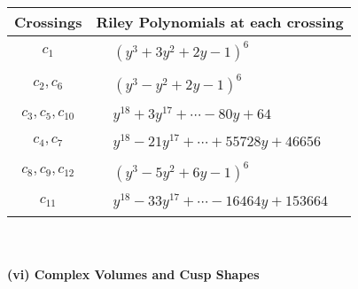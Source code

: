 \documentclass[1p]{elsarticle_modified}
\theoremstyle{definition}
\begin{document}
\begin{tabular}{m{50pt}|m{274pt}}
Crossings & \hspace{64pt}Riley Polynomials at each crossing \\
\hline $$\begin{aligned}c_{1}\end{aligned}$$&$\begin{aligned}
&(y^3+3 y^2+2 y-1)^6
\end{aligned}$\\
\hline $$\begin{aligned}c_{2},c_{6}\end{aligned}$$&$\begin{aligned}
&(y^3- y^2+2 y-1)^6
\end{aligned}$\\
\hline $$\begin{aligned}c_{3},c_{5},c_{10}\end{aligned}$$&$\begin{aligned}
&y^{18}+3 y^{17}+\cdots-80 y+64
\end{aligned}$\\
\hline $$\begin{aligned}c_{4},c_{7}\end{aligned}$$&$\begin{aligned}
&y^{18}-21 y^{17}+\cdots+55728 y+46656
\end{aligned}$\\
\hline $$\begin{aligned}c_{8},c_{9},c_{12}\end{aligned}$$&$\begin{aligned}
&(y^3-5 y^2+6 y-1)^6
\end{aligned}$\\
\hline $$\begin{aligned}c_{11}\end{aligned}$$&$\begin{aligned}
&y^{18}-33 y^{17}+\cdots-16464 y+153664
\end{aligned}$\\
\hline
\end{tabular}\\~\\
\newpage\flushleft \textbf{(vi) Complex Volumes and Cusp Shapes}
\end{document}
